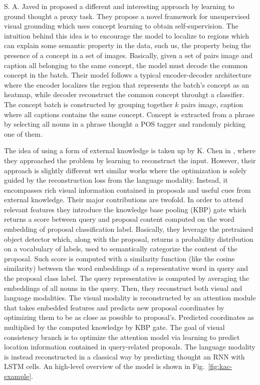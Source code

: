 S. A. Javed \etal{} in \cite{javed2018learning} proposed a different
and interesting approach by learning to ground thought a proxy task.
They propose a novel framework for unsupervised visual grounding which
uses concept learning to obtain self-supervision. The intuition behind
this idea is to encourage the model to localize to regions which can
explain some semantic property in the data, such us, the property
being the presence of a concept in a set of images. Basically, given a
set of pairs image and caption all belonging to the same concept, the
model must decode the common concept in the batch. Their model follows
a typical encoder-decoder architecture where the encoder localizes the
region that represents the batch's concept as an heatmap, while
decoder reconstruct the common concept throuhgt a classifier. The
concept batch is constructed by grouping together $k$ pairs image,
caption where all captions contains the same concept. Concept is
extracted from a phrase by selecting all nouns in a phrase thought a
POS tagger and randomly picking one of them.

The idea of using a form of external knowledge is taken up by K. Chen
\etal{} in \cite{chen2018knowledge}, where they approached the problem
by learning to reconstruct the input. However, their approach is
slightly different wrt similar works where the optimization is solely
guided by the reconstruction loss from the language modality. Instead,
it encompasses rich visual information contained in proposals and
useful cues from external knowledge. Their major contributions are
twofold. In order to attend relevant features they introduce the
knowledge base pooling (KBP) gate which returns a score between query
and proposal content computed on the word embedding of proposal
classification label. Basically, they leverage the pretrained object
detector which, along with the proposal, returns a probability
distribution on a vocabulary of labels, used to semantically
categorize the content of the proposal. Such score is computed with a
similarity function (like the cosine similarity) between the word
embeddings of a representative word in query and the proposal class
label. The query representative is computed by averaging the
embeddings of all nouns in the query. Then, they reconstruct both
visual and language modalities. The visual modality is reconstructed
by an attention module that takes embedded features and predicts new
proposal coordinates by optimizing them to be as close as possible to
proposal's. Predicted coordinates as multiplied by the computed
knowledge by KBP gate. The goal of visual consistency branch is to
optimize the attention model via learning to predict location
information contained in query-related proposals. The language
modality is instead reconstructed in a classical way by predicting
thought an RNN with LSTM cells. An high-level overview of the model is
shown in Fig.~\ref{fig:kac-example}.

